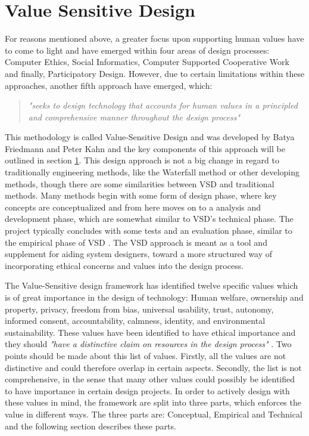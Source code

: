 \section{Value Sensitive Design}
\label{subsec:vsd_framework}
For reasons mentioned above, a greater focus upon supporting human values have to come to light and have emerged within four areas of design processes: Computer Ethics, Social Informatics, Computer Supported Cooperative Work and finally, Participatory Design\citep[p. 3]{FriedmanVSDandIS}. However, due to certain limitations within these approaches, another fifth approach have emerged, which: 
\begin{quotation}
\textit{"seeks to design technology that accounts for human values in a principled and comprehensive manner throughout the design process"} \citep[p. 1186]{HumanValuesEthicsAndDesign}
\end{quotation}

This methodology is called Value-Sensitive Design and was developed by Batya Friedmann and Peter Kahn \citep{HumanValuesEthicsAndDesign} and the key components of this approach will be outlined in section \ref{subsec:vsd_framework}.\newline
This design approach is not a big change in regard to traditionally engineering methods, like the Waterfall method or other developing methods, though there are some similarities between VSD and traditional methods. Many methods begin with some form of design phase, where key concepts are conceptualized and from here moves on to a analysis and development phase, which are somewhat similar to VSD's technical phase. The project typically concludes with some tests and an evaluation phase, similar to the empirical phase of VSD \citep[p. 704]{IntegratingEthicsCummings}. The VSD approach is meant as a tool and supplement for aiding system designers, toward a more structured way of incorporating ethical concerns and values into the design process.\newline 

The Value-Sensitive design framework has identified twelve specific values which is of great importance in the design of technology: Human welfare, ownership and property, privacy, freedom from bias, universal usability, trust, autonomy, informed consent, accountability, calmness, identity, and environmental sustainability. These values have been identified to have ethical importance and they should \textit{"have a distinctive claim on resources in the design process"} \citep[p. 1187]{HumanValuesEthicsAndDesign}. Two points should be made about this list of values. Firstly, all the values are not distinctive and could therefore overlap in certain aspects. Secondly, the list is not comprehensive, in the sense that many other values could possibly be identified to have importance in certain design projects.\newline 
In order to actively design with these values in mind, the framework are split into three parts, which enforces the value in different ways. The three parts are: Conceptual, Empirical and Technical and the following section describes these parts. 


